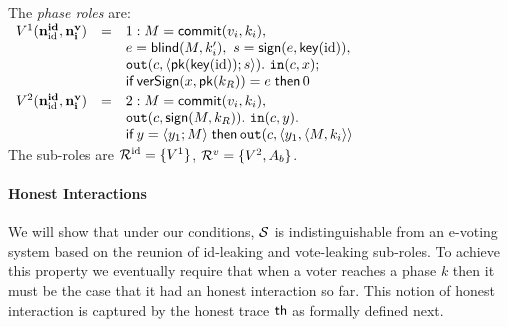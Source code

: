 
\begin{example}
\label{ex:foo-divide}  
The {\em phase roles} are:\\[0.5mm]
\null\hfill$
  \begin{array}[h]{rclr}
    V^1(\nID{\id},\nV{i}) &=& \phase 1
                M = \com(v_i,k_i),&\\
             && e = \bl(M,k'_i),\ s=\sign(e,\key(\id)), &\\
             && \Out(c, \langle \pk(\key(\id)); s\rangle).\ \In(c, x); &\\
             && \If\, \versign(x,\pk(k_R))=e\; \Then\, 0&\\[0.7mm]
    V^2(\nID{\id},\nV{i}) &=&
                \phase 2 
                M = \com(v_i,k_i),&\\
             && \Out(c,\sign(M,k_R)).\ \In(c, y).  &\\
             && \If\, y=\langle y_1 ; M\rangle \;
              \Then\, \Out(c,\pair{y_1}{\pair{M}{k_i}} &\\
  \end{array}$\hfill\null\\[0.5mm]
The sub-roles are
$\roles^\id=\{V^1\}$, $\roles^v=\{V^2,A_b\}$.
\end{example}





\paragraph{\textbf{Honest Interactions}}
We will show that under our conditions,
$\S$ is indistinguishable from an e-voting system based on
the reunion of id-leaking and vote-leaking sub-roles. 
To achieve this property we eventually require that when a voter
reaches a phase $k$ then it must be the case that it had an honest
interaction so far. This notion of honest interaction is captured
by the honest trace $\th$ as formally defined next.

